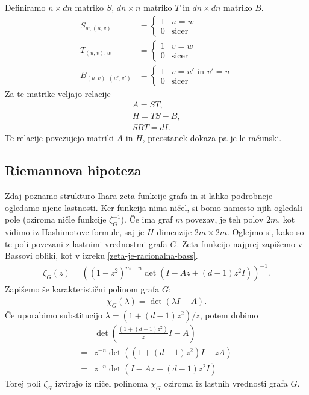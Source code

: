 \begin{dokaz}
    Definiramo \(n\times dn\) matriko \(S\), \(dn \times n\) matriko \(T\) in \(dn \times dn\) matriko \(B\).
    \begin{align*}
        S_{w, (u, v)} &= \begin{cases}
            1 & u = w\\
            0 & \text{sicer}
        \end{cases}\\
        T_{(u, v), w} &= \begin{cases}
            1 & v = w\\
            0 & \text{sicer}
        \end{cases}\\
        B_{(u, v), (u', v')} &= \begin{cases}
            1 & v = u' \text{ in } v' = u\\
            0 & \text{sicer}
        \end{cases}
    \end{align*}
    Za te matrike veljajo relacije
    \begin{align*}
        A = ST, \\ 
        H = TS - B, \\
        SBT = dI.
    \end{align*}
    Te relacije povezujejo matriki \(A\) in \(H\), preostanek dokaza pa je le računski.
\end{dokaz}

\subsection{Riemannova hipoteza}

Zdaj poznamo strukturo Ihara zeta funkcije grafa in si lahko podrobneje ogledamo njene lastnosti. Ker funkcija nima ničel, si bomo namesto njih ogledali pole (oziroma ničle funkcije \(\zeta_G^{-1}\)). Če ima graf \(m\) povezav, je teh polov \(2m\), kot vidimo iz Hashimotove formule, saj je \(H\) dimenzije \(2m\times 2m\). Oglejmo si, kako so te poli povezani z lastnimi vrednostmi grafa \(G\). Zeta funkcijo najprej zapišemo v Bassovi obliki, kot v izreku \ref{zeta-je-racionalna-bass}.
\begin{align*}
    \zeta_G(z) = \left((1-z^2)^{m-n}\det(I-Az+(d-1)z^2I)\right)^{-1}.
\end{align*}
Zapišemo še karakteristični polinom grafa \(G\):
\begin{align*}
    \chi_G(\lambda ) = \det(\lambda I-A).
\end{align*}
Če uporabimo substitucijo \(\lambda = (1+(d-1)z^2)/z\), potem dobimo
\begin{align*}
    &\det\left(\frac{(1+(d-1)z^2)}{z} I - A\right)\\
    =& z^{-n}\det\left((1+(d-1)z^2) I - zA\right) \\
    =& z^{-n}\det\left(I-Az+(d-1)z^2I\right) 
\end{align*}
Torej poli \(\zeta_G\) izvirajo iz ničel polinoma \(\chi_G\) oziroma iz lastnih vrednosti grafa \(G\).

